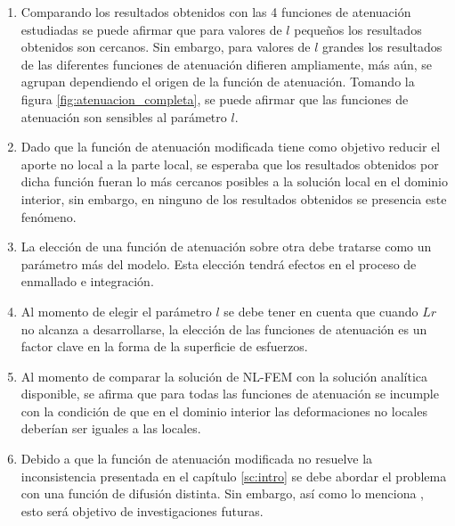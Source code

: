 \begin{enumerate}
	\item Comparando los resultados obtenidos con las 4 funciones de atenuación estudiadas se puede afirmar que para valores de $l$ pequeños los resultados obtenidos son cercanos. Sin embargo, para valores de $l$ grandes los resultados de las diferentes funciones de atenuación difieren ampliamente, más aún, se agrupan dependiendo el origen de la función de atenuación. Tomando la figura \ref{fig:atenuacion_completa}, se puede afirmar que las funciones de atenuación son sensibles al parámetro $l$.
	\item Dado que la función de atenuación modificada tiene como objetivo reducir el aporte no local a la parte local, se esperaba que los resultados obtenidos por dicha función fueran lo más cercanos posibles a la solución local en el dominio interior, sin embargo, en ninguno de los resultados obtenidos se presencia este fenómeno.
	\item La elección de una función de atenuación sobre otra debe tratarse como un parámetro más del modelo. Esta elección tendrá efectos en el proceso de enmallado e integración.
	\item Al momento de elegir el parámetro $l$ se debe tener en cuenta que cuando $Lr$ no alcanza a desarrollarse, la elección de las funciones de atenuación es un factor clave en la forma de la superficie de esfuerzos.
	\item Al momento de comparar la solución de NL-FEM con la solución analítica disponible, se afirma que para todas las funciones de atenuación se incumple con la condición de que en el dominio interior las deformaciones no locales deberían ser iguales a las locales.
	\item Debido a que la función de atenuación modificada no resuelve la inconsistencia presentada en el capítulo \ref{sc:intro} se debe abordar el problema con una función de difusión distinta. Sin embargo, así como lo menciona \textcite{DiPaola2009}, esto será objetivo de investigaciones futuras.
\end{enumerate}
